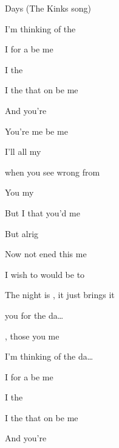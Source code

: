 \begin{SBSong}{Days (The Kinks song)}
\begin{SBVerse}
      I'm thinking of the  

      I  for  a   be me  

      I  the 

      I  the  that  on  be me   

      And  you're 

      You're  me    be me  
    \end{SBVerse}
    \CBPageBrk
    \begin{SBVerse}
 	 I'll  all my 

       when you  see wrong from 

	  You  my 

	  But  I  that   you'd  me 

	  But  alrig

      Now  not ened	 this   me 
    \end{SBVerse}
    \begin{SBVerse}
      I wish to would be to
    
      The night is , it just brings   it  
    \end{SBVerse}
    \begin{SBVerse}
	   you for the da\ldots{}

	    , 
	    those   you  me 

	  I'm thinking of the da\ldots{}
	
	  I  for  a   be me  

	  I  the 

	  I  the  that  on  be me   

	  And  you're 


\end{SBVerse}
\end{SBSong}

